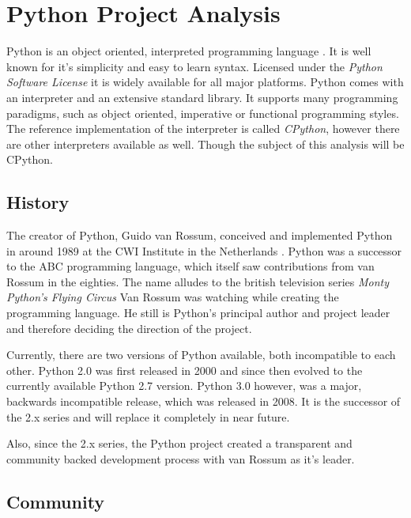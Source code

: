 \section{Python Project Analysis} %


Python is an object oriented, interpreted programming language
\cite{PythonAbout}. It is well known for it's simplicity and easy to learn
syntax. Licensed under the \emph{Python Software License} \cite{PythonLicence}
it is widely available for all major platforms. Python comes with an
interpreter and an extensive standard library. It supports many programming
paradigms, such as object oriented, imperative or functional programming
styles. The reference implementation of the interpreter is called
\emph{CPython}, however there are other interpreters available as well. Though
the subject of this analysis will be CPython.

\subsection{History} %

The creator of Python, Guido van Rossum, conceived and implemented Python in
around 1989 at the CWI Institute in the Netherlands \cite{Venners2003}. Python
was a successor to the ABC programming language, which itself saw contributions
from van Rossum in the eighties. The name alludes to the british television
series \emph{Monty Python's Flying Circus} Van Rossum was watching while
creating the programming language. He still is Python's principal author and
project leader and therefore deciding the direction of the project.

Currently, there are two versions of Python available, both incompatible to
each other. Python 2.0 was first released in 2000 and since then evolved to the
currently available Python 2.7 version. Python 3.0 however, was a major,
backwards incompatible release, which was released in 2008. It is the successor
of the 2.x series and will replace it completely in near future.

Also, since the 2.x series, the Python project created a transparent and
community backed development process with van Rossum as it's leader.


\subsection{Community} %

